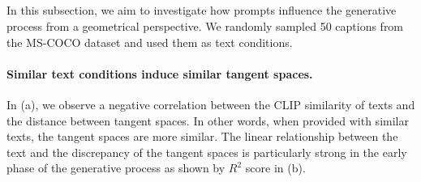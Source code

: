 \subsection{}
\label{sec:text}


In this subsection, we aim to investigate how prompts influence the generative process from a geometrical perspective. 
We randomly sampled 50 captions from the MS-COCO dataset \cite{lin2014microsoft} and used them as text conditions.



\paragraph{Similar text conditions induce similar tangent spaces.}
In  (a), we observe a negative correlation between the CLIP similarity of texts and the distance between tangent spaces. 
In other words, when provided with similar texts, the tangent spaces are more similar. 
The linear relationship between the text and the discrepancy of the tangent spaces is particularly strong in the early phase of the generative process as shown by $R^2$ score in  (b).

